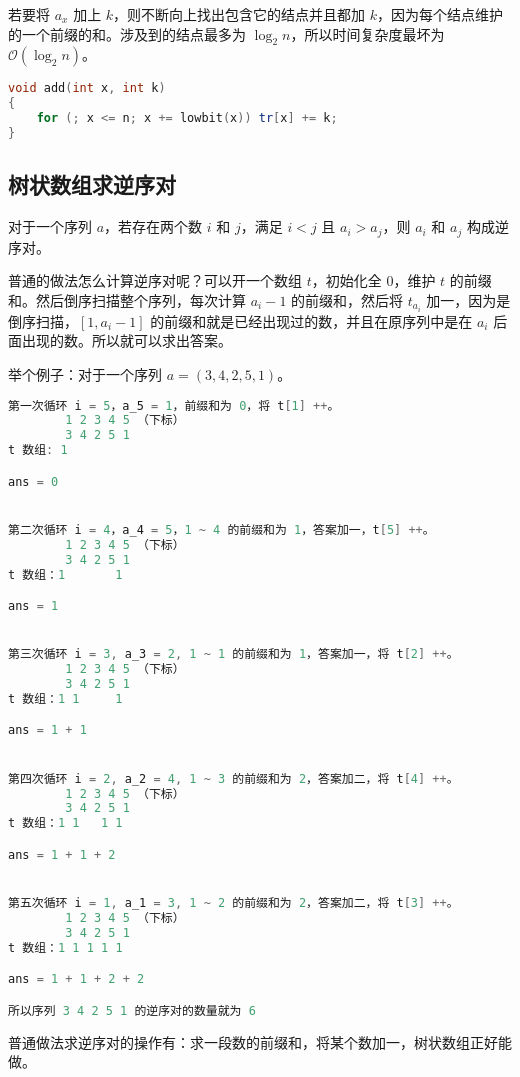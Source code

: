 若要将 $a_x$ 加上 $k$，则不断向上找出包含它的结点并且都加 $k$，因为每个结点维护的一个前缀的和。涉及到的结点最多为 $\log_2 n$，所以时间复杂度最坏为 $\mathcal{O}(\log_2 n)$。

\begin{lstlisting}[language=cpp]
void add(int x, int k)
{
    for (; x <= n; x += lowbit(x)) tr[x] += k;
}
\end{lstlisting}

\subsection{树状数组求逆序对}

对于一个序列 $a$，若存在两个数 $i$ 和 $j$，满足 $i < j$ 且 $a_i > a_j$，则 $a_i$ 和 $a_j$ 构成逆序对。

普通的做法怎么计算逆序对呢？可以开一个数组 $t$，初始化全 $0$，维护 $t$ 的前缀和。然后倒序扫描整个序列，每次计算 $a_i - 1$ 的前缀和，然后将 $t_{a_i}$ 加一，因为是倒序扫描，$[1, a_i - 1]$ 的前缀和就是已经出现过的数，并且在原序列中是在 $a_i$ 后面出现的数。所以就可以求出答案。

举个例子：对于一个序列 $a = (3, 4, 2, 5, 1)$。

\begin{lstlisting}[language=cpp]
第一次循环 i = 5，a_5 = 1，前缀和为 0，将 t[1] ++。
        1 2 3 4 5 （下标）
        3 4 2 5 1
t 数组: 1

ans = 0


第二次循环 i = 4，a_4 = 5，1 ~ 4 的前缀和为 1，答案加一，t[5] ++。
        1 2 3 4 5 （下标）
        3 4 2 5 1
t 数组：1       1

ans = 1


第三次循环 i = 3, a_3 = 2, 1 ~ 1 的前缀和为 1，答案加一，将 t[2] ++。
        1 2 3 4 5 （下标）
        3 4 2 5 1
t 数组：1 1     1

ans = 1 + 1


第四次循环 i = 2, a_2 = 4, 1 ~ 3 的前缀和为 2，答案加二，将 t[4] ++。
        1 2 3 4 5 （下标）
        3 4 2 5 1
t 数组：1 1   1 1

ans = 1 + 1 + 2


第五次循环 i = 1, a_1 = 3, 1 ~ 2 的前缀和为 2，答案加二，将 t[3] ++。
        1 2 3 4 5 （下标）
        3 4 2 5 1
t 数组：1 1 1 1 1

ans = 1 + 1 + 2 + 2

所以序列 3 4 2 5 1 的逆序对的数量就为 6
\end{lstlisting}

普通做法求逆序对的操作有：求一段数的前缀和，将某个数加一，树状数组正好能做。

